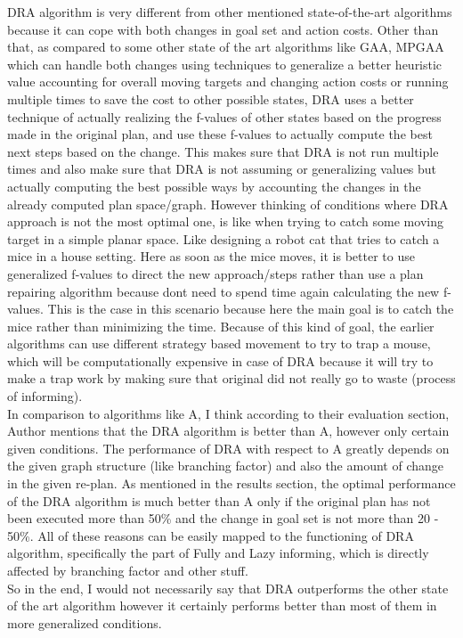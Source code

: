 \documentclass[a4paper]{article}
\begin{document}
DRA\text{*} algorithm is very different from other mentioned state-of-the-art algorithms because it can cope with both changes in goal set and action costs. Other than that, as compared to some other state of the art algorithms like GAA\text{*}, MPGAA\text{*} which can handle both changes using techniques to generalize a better heuristic value accounting for overall moving targets and changing action costs or running multiple times to save the cost to other possible states, DRA\text{*} uses a better technique of actually realizing the f-values of other states based on the progress made in the original plan, and use these f-values to actually compute the best next steps based on the change. This makes sure that DRA\text{*} is not run multiple times and also make sure that DRA\text{*} is not assuming or generalizing values but actually computing the best possible ways by accounting the changes in the already computed plan space/graph. However thinking of conditions where DRA\text{*} approach is not the most optimal one, is like when trying to catch some moving target in a simple planar space. Like designing a robot cat that tries to catch a mice in a house setting. Here as soon as the mice moves, it is better to use generalized f-values to direct the new approach/steps rather than use a plan repairing algorithm because dont need to spend time again calculating the new f-values. This is the case in this scenario because here the main goal is to catch the mice rather than minimizing the time. Because of this kind of goal, the earlier algorithms can use different strategy based movement to try to trap a mouse, which will be computationally expensive in case of DRA\text{*} because it will try to make a trap work by making sure that original did not really go to waste (process of informing).
\\

In comparison to algorithms like A\text{*}, I think according to their evaluation section, Author mentions that the DRA\text{*} algorithm is better than A\text{*}, however only certain given conditions. The performance of DRA\text{*} with respect to A\text{*} greatly depends on the given graph structure (like branching factor) and also the amount of change in the given re-plan. As mentioned in the results section, the optimal performance of the DRA\text{*} algorithm is much better than A\text{*} only if the original plan has not been executed more than 50\% and the change in goal set is not more than 20 - 50\%.  All of these reasons can be easily mapped to the functioning of DRA\text{*} algorithm, specifically the part of Fully and Lazy informing, which is directly affected by branching factor and other stuff.
\\

So in the end, I would not necessarily say that DRA\text{*} outperforms the other state of the art algorithm however it certainly performs better than most of them in more generalized conditions.
\end{document}
